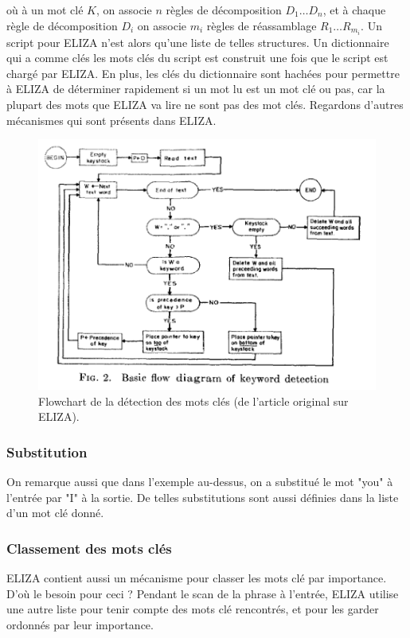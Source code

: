 \documentclass[11pt, a4paper]{report}
\begin{document}
  où à un mot clé $K$, on associe $n$ règles de décomposition $D_{1} \ldots D_{n}$, et à 
  chaque règle de décomposition $D_{i}$ on associe $m_{i}$ règles de réassamblage 
  $R_{1} \ldots R_{m_{i}}$. Un script pour ELIZA 
  n'est alors qu'une liste de telles structures. Un dictionnaire qui a comme clés 
  les mots clés du script est construit une fois que le script est chargé par ELIZA. 
  En plus, les clés du dictionnaire sont hachées pour permettre à ELIZA de déterminer 
  rapidement si un mot lu est un mot clé ou pas, car la plupart des mots que ELIZA va lire 
  ne sont pas des mot clés. Regardons 
  d'autres mécanismes qui sont présents dans ELIZA.

  \begin{figure}[t]
    \centering
    \includegraphics[width=1\textwidth]{eliza-keyword-detection.png}
    \caption{Flowchart de la détection des mots clés (de l'article original sur ELIZA).}
    \label{fig:eliza-flowchart}
  \end{figure}

  \subsubsection{Substitution}
  On remarque aussi que dans l'exemple au-dessus, on a substitué le mot "you" à l'entrée par "I"
  à la sortie. De telles substitutions sont aussi définies dans la liste d'un mot clé donné.  
  
  \subsubsection{Classement des mots clés}
  ELIZA contient aussi un mécanisme pour classer les mots clé par importance. D'où le besoin 
  pour ceci ?  Pendant le scan de la phrase à l'entrée, 
  ELIZA utilise une autre liste pour tenir compte des mots clé rencontrés, et pour les garder 
  ordonnés par leur importance.
  
\end{document}
